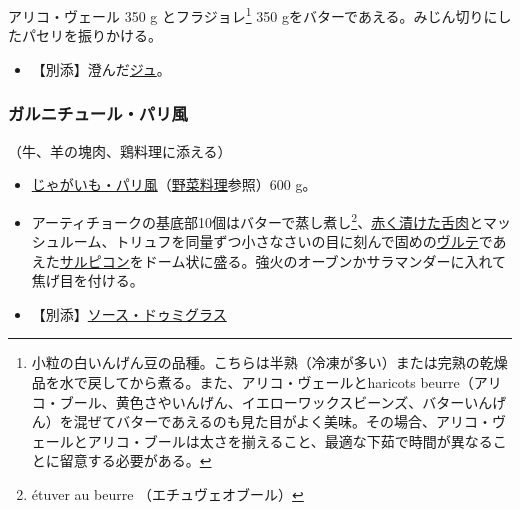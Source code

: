 \begin{recette}


アリコ・ヴェール 350 g とフラジョレ\footnote{小粒の白いんげん豆の品種。こちらは半熟（冷凍が多い）または完熟の乾燥品を水で戻してから煮る。また、アリコ・ヴェールとharicots
  beurre（アリコ・ブール、黄色さやいんげん、イエローワックスビーンズ、バターいんげん）を混ぜてバターであえるのも見た目がよく美味。その場合、アリコ・ヴェールとアリコ・ブールは太さを揃えること、最適な下茹で時間が異なることに留意する必要がある。}
350 gをバターであえる。みじん切りにしたパセリを振りかける。

\begin{itemize}
\tightlist
\item
  【別添】澄んだ\protect\hyperlink{jus-de-veau-lie}{ジュ}。
\end{itemize}

\atoaki{}

\hypertarget{garniture-parisienne}{%
\subsubsection{ガルニチュール・パリ風}\label{garniture-parisienne}}



（牛、羊の塊肉、鶏料理に添える）

\begin{itemize}
\item
  \protect\hyperlink{pommes-de-terres-parisienne}{じゃがいも・パリ風}（\protect\hyperlink{legumes}{野菜料理}参照）600
  g。
\item
  アーティチョークの基底部10個はバターで蒸し煮し\footnote{étuver au
    beurre （エチュヴェオブール）}、\protect\hyperlink{saumure-liquide-pour-langues}{赤く漬けた舌肉}とマッシュルーム、トリュフを同量ずつ小さなさいの目に刻んで固めの\protect\hyperlink{veloute}{ヴルテ}であえた\protect\hyperlink{salpicons-divers}{サルピコン}をドーム状に盛る。強火のオーブンかサラマンダーに入れて焦げ目を付ける。
\item
  【別添】\protect\hyperlink{sauce-demi-glace}{ソース・ドゥミグラス}
\end{itemize}


\end{recette}

